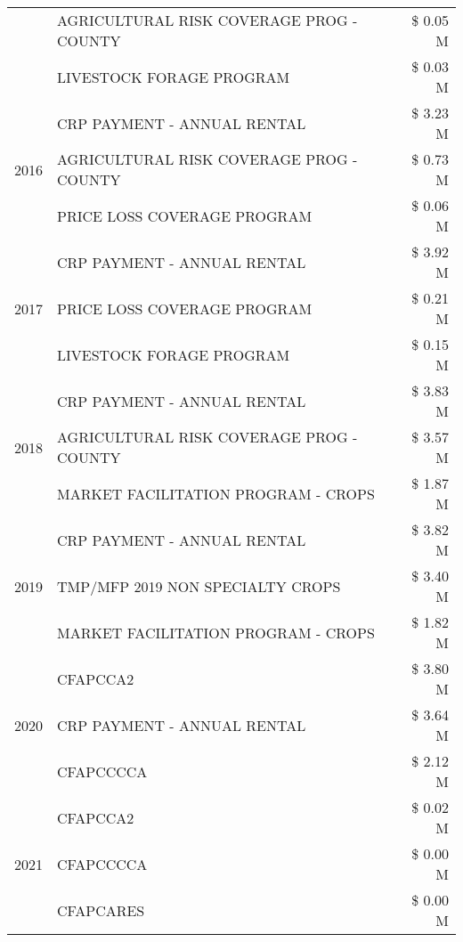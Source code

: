 \begin{tabular}{llr}
 & AGRICULTURAL RISK COVERAGE PROG - COUNTY & \$ 0.05 M \\
 & LIVESTOCK FORAGE PROGRAM & \$ 0.03 M \\
\cline{1-3}
\multirow[t]{3}{*}{2016} & CRP PAYMENT - ANNUAL RENTAL & \$ 3.23 M \\
 & AGRICULTURAL RISK COVERAGE PROG - COUNTY & \$ 0.73 M \\
 & PRICE LOSS COVERAGE PROGRAM & \$ 0.06 M \\
\cline{1-3}
\multirow[t]{3}{*}{2017} & CRP PAYMENT - ANNUAL RENTAL & \$ 3.92 M \\
 & PRICE LOSS COVERAGE PROGRAM & \$ 0.21 M \\
 & LIVESTOCK FORAGE PROGRAM & \$ 0.15 M \\
\cline{1-3}
\multirow[t]{3}{*}{2018} & CRP PAYMENT - ANNUAL RENTAL & \$ 3.83 M \\
 & AGRICULTURAL RISK COVERAGE PROG - COUNTY & \$ 3.57 M \\
 & MARKET FACILITATION PROGRAM - CROPS & \$ 1.87 M \\
\cline{1-3}
\multirow[t]{3}{*}{2019} & CRP PAYMENT - ANNUAL RENTAL & \$ 3.82 M \\
 & TMP/MFP 2019 NON SPECIALTY CROPS & \$ 3.40 M \\
 & MARKET FACILITATION PROGRAM - CROPS & \$ 1.82 M \\
\cline{1-3}
\multirow[t]{3}{*}{2020} & CFAPCCA2 & \$ 3.80 M \\
 & CRP PAYMENT - ANNUAL RENTAL & \$ 3.64 M \\
 & CFAPCCCCA & \$ 2.12 M \\
\cline{1-3}
\multirow[t]{3}{*}{2021} & CFAPCCA2 & \$ 0.02 M \\
 & CFAPCCCCA & \$ 0.00 M \\
 & CFAPCARES & \$ 0.00 M \\
\cline{1-3}
\bottomrule
\end{tabular}
